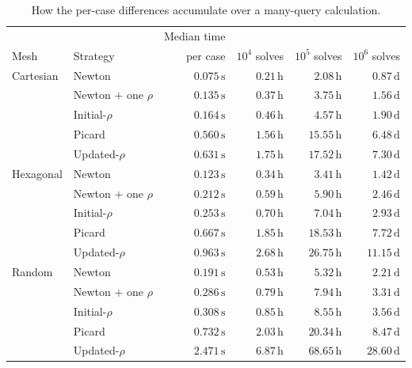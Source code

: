 \begin{table}[htb]
\centering
\caption{How the per-case differences accumulate over a many-query calculation.}
\label{tab:many_query_projection}
\setlength{\tabcolsep}{5pt}
\begin{tabular}{llrrrr}
\toprule
\rowcolor{gray!12}
 & & Median time & & & \\
\rowcolor{gray!12}
Mesh & Strategy & per case & $10^4$ solves & $10^5$ solves & $10^6$ solves \\
\midrule
Cartesian & Newton & $0.075\,\mathrm{s}$ & $0.21\,\mathrm{h}$ & $2.08\,\mathrm{h}$ & $0.87\,\mathrm{d}$ \\
 & Newton $+$ one $\rho$ & $0.135\,\mathrm{s}$ & $0.37\,\mathrm{h}$ & $3.75\,\mathrm{h}$ & $1.56\,\mathrm{d}$ \\
 & Initial-$\rho$ & $0.164\,\mathrm{s}$ & $0.46\,\mathrm{h}$ & $4.57\,\mathrm{h}$ & $1.90\,\mathrm{d}$ \\
 & Picard & $0.560\,\mathrm{s}$ & $1.56\,\mathrm{h}$ & $15.55\,\mathrm{h}$ & $6.48\,\mathrm{d}$ \\
 & Updated-$\rho$ & $0.631\,\mathrm{s}$ & $1.75\,\mathrm{h}$ & $17.52\,\mathrm{h}$ & $7.30\,\mathrm{d}$ \\
\addlinespace[2pt]
Hexagonal & Newton & $0.123\,\mathrm{s}$ & $0.34\,\mathrm{h}$ & $3.41\,\mathrm{h}$ & $1.42\,\mathrm{d}$ \\
 & Newton $+$ one $\rho$ & $0.212\,\mathrm{s}$ & $0.59\,\mathrm{h}$ & $5.90\,\mathrm{h}$ & $2.46\,\mathrm{d}$ \\
 & Initial-$\rho$ & $0.253\,\mathrm{s}$ & $0.70\,\mathrm{h}$ & $7.04\,\mathrm{h}$ & $2.93\,\mathrm{d}$ \\
 & Picard & $0.667\,\mathrm{s}$ & $1.85\,\mathrm{h}$ & $18.53\,\mathrm{h}$ & $7.72\,\mathrm{d}$ \\
 & Updated-$\rho$ & $0.963\,\mathrm{s}$ & $2.68\,\mathrm{h}$ & $26.75\,\mathrm{h}$ & $11.15\,\mathrm{d}$ \\
\addlinespace[2pt]
Random & Newton & $0.191\,\mathrm{s}$ & $0.53\,\mathrm{h}$ & $5.32\,\mathrm{h}$ & $2.21\,\mathrm{d}$ \\
 & Newton $+$ one $\rho$ & $0.286\,\mathrm{s}$ & $0.79\,\mathrm{h}$ & $7.94\,\mathrm{h}$ & $3.31\,\mathrm{d}$ \\
 & Initial-$\rho$ & $0.308\,\mathrm{s}$ & $0.85\,\mathrm{h}$ & $8.55\,\mathrm{h}$ & $3.56\,\mathrm{d}$ \\
 & Picard & $0.732\,\mathrm{s}$ & $2.03\,\mathrm{h}$ & $20.34\,\mathrm{h}$ & $8.47\,\mathrm{d}$ \\
 & Updated-$\rho$ & $2.471\,\mathrm{s}$ & $6.87\,\mathrm{h}$ & $68.65\,\mathrm{h}$ & $28.60\,\mathrm{d}$ \\
\bottomrule
\end{tabular}
\end{table}

